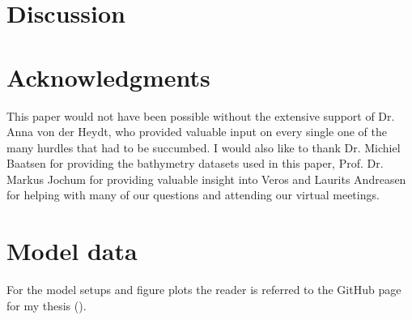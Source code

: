 \documentclass[a4paper]{article}
\begin{document}
\begin{multicols}{2}



\section{Discussion}

\section{Acknowledgments}
This paper would not have been possible without the extensive support of Dr. Anna von der Heydt, who provided valuable input on every single one of the many hurdles that had to be succumbed. I would also like to thank Dr. Michiel Baatsen for providing the bathymetry datasets used in this paper, Prof. Dr. Markus Jochum for providing valuable insight into Veros and Laurits Andreasen for helping with many of our questions and attending our virtual meetings.
\section{Model data}
For the model setups and figure plots the reader is referred to the GitHub page for my thesis (\cite{Marte2020}).

%

\printbibliography


\end{multicols}
\appendix
\end{document}
